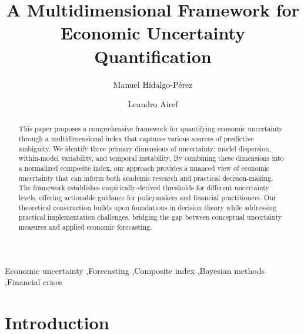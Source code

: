 \documentclass[5p,authoryear]{elsarticle}
\begin{document}
\begin{frontmatter}

\title{A Multidimensional Framework for Economic Uncertainty Quantification}    

\author[1]{Manuel Hidalgo-Pérez%
 }

\author[2]{Leandro Airef}




\begin{abstract}
This paper proposes a comprehensive framework for quantifying economic uncertainty through a multidimensional index that captures various sources of predictive ambiguity. We identify three primary dimensions of uncertainty: model dispersion, within-model variability, and temporal instability. By combining these dimensions into a normalized composite index, our approach provides a nuanced view of economic uncertainty that can inform both academic research and practical decision-making. The framework establishes empirically-derived thresholds for different uncertainty levels, offering actionable guidance for policymakers and financial practitioners. Our theoretical construction builds upon foundations in decision theory while addressing practical implementation challenges, bridging the gap between conceptual uncertainty measures and applied economic forecasting.
\end{abstract}

\begin{keyword}
Economic uncertainty \sep Forecasting \sep Composite index \sep Bayesian methods \sep Financial crises
\end{keyword}

\end{frontmatter}

\section{Introduction}
\end{document}
